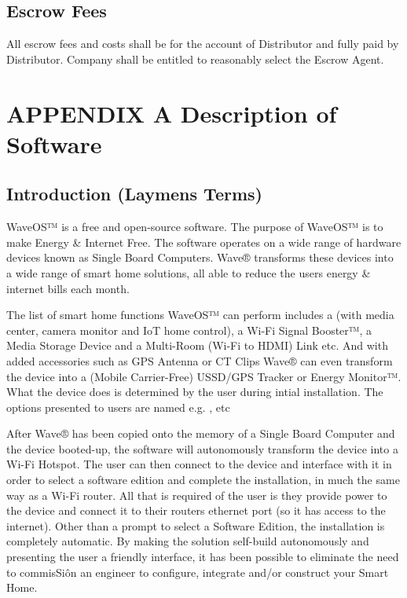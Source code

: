 \documentclass[letterpaper,10pt,english]{sphinxmanual}
\begin{document}
\section{Escrow Fees}
\label{\detokenize{escrow:escrow-fees}}
All escrow fees and costs shall be for the account of Distributor and fully paid by Distributor. Company shall be entitled to reasonably select the Escrow Agent.


\chapter{APPENDIX A \textendash{} Description of Software}
\label{\detokenize{appendix-a:appendix-a-description-of-software}}\label{\detokenize{appendix-a::doc}}


\section{Introduction (Laymens Terms)}
\label{\detokenize{appendix-a:introduction-laymens-terms}}
WaveOS™ is a free and open-source software. The purpose of WaveOS™ is to make Energy \& Internet Free. The software operates on a wide range of hardware devices known as Single Board Computers. Wave® transforms these devices into a wide range of smart home solutions, all able to reduce the users energy \& internet bills each month.

The list of smart home functions WaveOS™ can perform includes a  (with media center, camera monitor and IoT home control), a Wi-Fi Signal Booster™, a Media Storage Device and a Multi-Room (Wi-Fi to HDMI) Link etc. And with added accessories such as GPS Antenna or CT Clips Wave® can even transform the device into a (Mobile Carrier-Free) USSD/GPS Tracker or Energy Monitor™. What the device does is determined by the user during intial installation. The options presented to users are named  e.g. ,  etc

After Wave® has been copied onto the memory of a Single Board Computer and the device booted-up, the software will autonomously transform the device into a Wi-Fi Hotspot. The user can then connect to the device and interface with it in order to select a software edition and complete the installation, in much the same way as a Wi-Fi router. All that is required of the user is they provide power to the device and connect it to their routers ethernet port (so it has access to the internet). Other than a prompt to select a Software Edition, the installation is completely automatic. By making the solution self-build autonomously and presenting the user a friendly interface, it has been possible to eliminate the need to commisSiôn an engineer to configure, integrate and/or construct your Smart Home.
\end{document}
